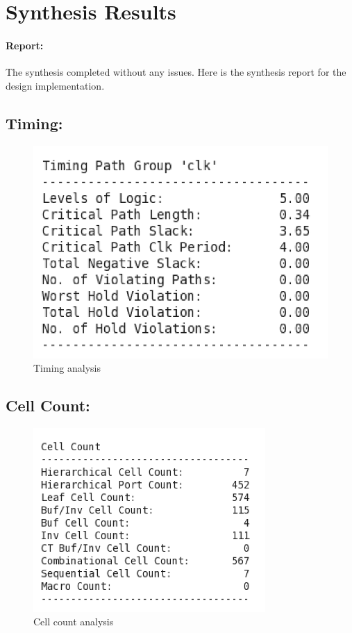 \documentclass[20pt]{article}
\begin{document}
\newpage
\section{Synthesis Results}
\paragraph{Report: }
The synthesis completed without any issues. Here is the synthesis report for the design implementation. 
\subsection{Timing:}

\begin{figure}[H]
	\includegraphics[width=0.9\linewidth]{Timing}
	\caption{Timing analysis }
\end{figure}

\subsection{Cell Count:}

\begin{figure}[H]
	\includegraphics[width=0.9\linewidth,height=7cm]{CellCount}
	\caption{Cell count analysis }
\end{figure}
\end{document}
